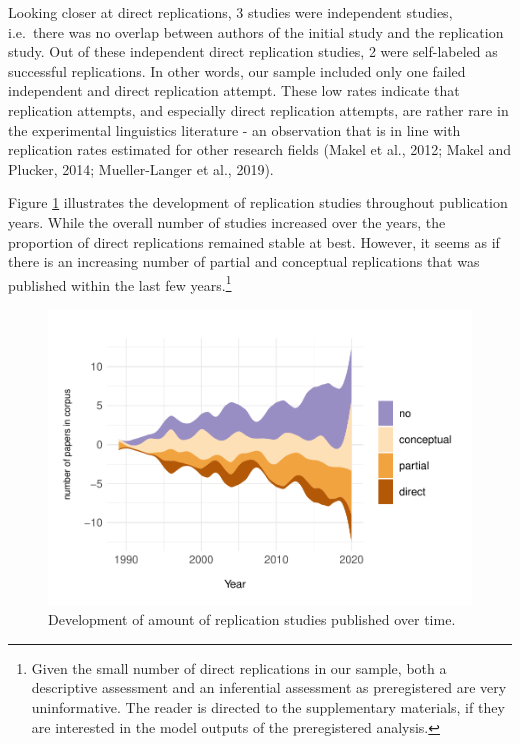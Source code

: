 \documentclass[]{elsarticle} %
\begin{document}
Looking closer at direct replications, 3 studies were independent studies, i.e.~there was no overlap between authors of the initial study and the replication study.
Out of these independent direct replication studies, 2 were self-labeled as successful replications.
In other words, our sample included only one failed independent and direct replication attempt. These low rates indicate that replication attempts, and especially direct replication attempts, are rather rare in the experimental linguistics literature - an observation that is in line with replication rates estimated for other research fields (Makel et al., 2012; Makel and Plucker, 2014; Mueller-Langer et al., 2019).

Figure \ref{fig:stream-plot} illustrates the development of replication studies throughout publication years.
While the overall number of studies increased over the years, the proportion of direct replications remained stable at best.
However, it seems as if there is an increasing number of partial and conceptual replications that was published within the last few years.\footnote{Given the small number of direct replications in our sample, both a descriptive assessment and an inferential assessment as preregistered are very uninformative. The reader is directed to the supplementary materials, if they are interested in the model outputs of the preregistered analysis.}

\begin{figure}

{\centering \includegraphics[width=1\linewidth]{ReplicationLing_files/figure-latex/stream-plot-1} 

}

\caption{Development of amount of replication studies published over time.}\label{fig:stream-plot}
\end{figure}
\end{document}

